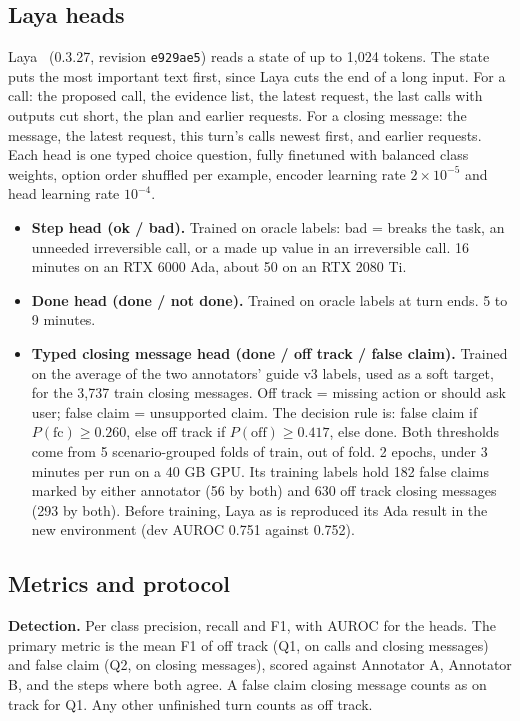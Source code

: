 \documentclass[10pt,a4paper]{article}
\newcommand{\code}[1]{\texttt{#1}}
\begin{document}
\subsection{Laya heads}
Laya~\cite{laya} (0.3.27, revision \code{e929ae5}) reads a state of up to 1,024 tokens. The state puts the most important text first, since Laya cuts the end of a long input. For a call: the proposed call, the evidence list, the latest request, the last calls with outputs cut short, the plan and earlier requests. For a closing message: the message, the latest request, this turn's calls newest first, and earlier requests. Each head is one typed choice question, fully finetuned with balanced class weights, option order shuffled per example, encoder learning rate $2\times10^{-5}$ and head learning rate $10^{-4}$.
\begin{itemize}
  \item \textbf{Step head (ok / bad).} Trained on oracle labels: bad = breaks the task, an unneeded irreversible call, or a made up value in an irreversible call. 16 minutes on an RTX 6000 Ada, about 50 on an RTX 2080 Ti.
  \item \textbf{Done head (done / not done).} Trained on oracle labels at turn ends. 5 to 9 minutes.
  \item \textbf{Typed closing message head (done / off track / false claim).} Trained on the average of the two annotators' guide v3 labels, used as a soft target, for the 3,737 train closing messages. Off track = missing action or should ask user; false claim = unsupported claim. The decision rule is: false claim if $P(\text{fc}) \ge 0.260$, else off track if $P(\text{off}) \ge 0.417$, else done. Both thresholds come from 5 scenario-grouped folds of train, out of fold. 2 epochs, under 3 minutes per run on a 40 GB GPU. Its training labels hold 182 false claims marked by either annotator (56 by both) and 630 off track closing messages (293 by both). Before training, Laya as is reproduced its Ada result in the new environment (dev AUROC 0.751 against 0.752).
\end{itemize}

\subsection{Metrics and protocol}
\textbf{Detection.} Per class precision, recall and F1, with AUROC for the heads. The primary metric is the mean F1 of off track (Q1, on calls and closing messages) and false claim (Q2, on closing messages), scored against Annotator A, Annotator B, and the steps where both agree. A false claim closing message counts as on track for Q1. Any other unfinished turn counts as off track.
\end{document}
